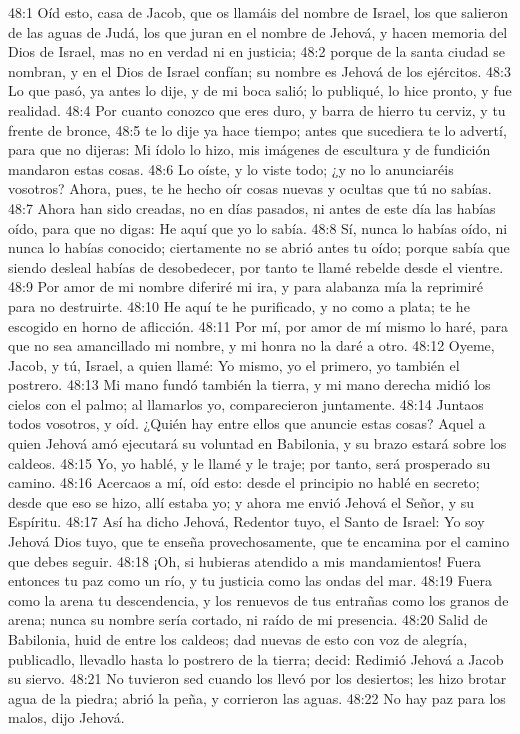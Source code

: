 48:1 Oíd esto, casa de Jacob, que os llamáis del nombre de Israel, los que salieron de las aguas de Judá, los que juran en el nombre de Jehová, y hacen memoria del Dios de Israel, mas no en verdad ni en justicia; 
48:2 porque de la santa ciudad se nombran, y en el Dios de Israel confían; su nombre es Jehová de los ejércitos. 
48:3 Lo que pasó, ya antes lo dije, y de mi boca salió; lo publiqué, lo hice pronto, y fue realidad. 
48:4 Por cuanto conozco que eres duro, y barra de hierro tu cerviz, y tu frente de bronce, 
48:5 te lo dije ya hace tiempo; antes que sucediera te lo advertí, para que no dijeras: Mi ídolo lo hizo, mis imágenes de escultura y de fundición mandaron estas cosas. 
48:6 Lo oíste, y lo viste todo; ¿y no lo anunciaréis vosotros? Ahora, pues, te he hecho oír cosas nuevas y ocultas que tú no sabías. 
48:7 Ahora han sido creadas, no en días pasados, ni antes de este día las habías oído, para que no digas: He aquí que yo lo sabía. 
48:8 Sí, nunca lo habías oído, ni nunca lo habías conocido; ciertamente no se abrió antes tu oído; porque sabía que siendo desleal habías de desobedecer, por tanto te llamé rebelde desde el vientre. 
48:9 Por amor de mi nombre diferiré mi ira, y para alabanza mía la reprimiré para no destruirte. 
48:10 He aquí te he purificado, y no como a plata; te he escogido en horno de aflicción. 
48:11 Por mí, por amor de mí mismo lo haré, para que no sea amancillado mi nombre, y mi honra no la daré a otro. 
48:12 Oyeme, Jacob, y tú, Israel, a quien llamé: Yo mismo, yo el primero, yo también el postrero. 
48:13 Mi mano fundó también la tierra, y mi mano derecha midió los cielos con el palmo; al llamarlos yo, comparecieron juntamente. 
48:14 Juntaos todos vosotros, y oíd. ¿Quién hay entre ellos que anuncie estas cosas? Aquel a quien Jehová amó ejecutará su voluntad en Babilonia, y su brazo estará sobre los caldeos. 
48:15 Yo, yo hablé, y le llamé y le traje; por tanto, será prosperado su camino. 
48:16 Acercaos a mí, oíd esto: desde el principio no hablé en secreto; desde que eso se hizo, allí estaba yo; y ahora me envió Jehová el Señor, y su Espíritu. 
48:17 Así ha dicho Jehová, Redentor tuyo, el Santo de Israel: Yo soy Jehová Dios tuyo, que te enseña provechosamente, que te encamina por el camino que debes seguir. 
48:18 ¡Oh, si hubieras atendido a mis mandamientos! Fuera entonces tu paz como un río, y tu justicia como las ondas del mar. 
48:19 Fuera como la arena tu descendencia, y los renuevos de tus entrañas como los granos de arena; nunca su nombre sería cortado, ni raído de mi presencia. 
48:20 Salid de Babilonia, huid de entre los caldeos; dad nuevas de esto con voz de alegría, publicadlo, llevadlo hasta lo postrero de la tierra; decid: Redimió Jehová a Jacob su siervo. 
48:21 No tuvieron sed cuando los llevó por los desiertos; les hizo brotar agua de la piedra; abrió la peña, y corrieron las aguas. 
48:22 No hay paz para los malos, dijo Jehová. 
